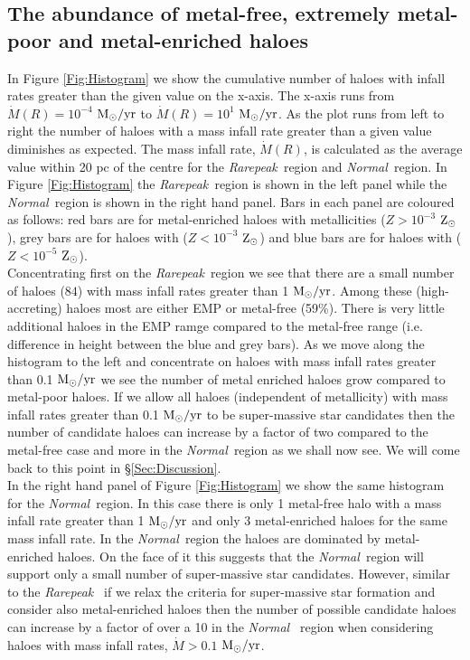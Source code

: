 \documentclass[graphics, twocolumn, usenatbib]{mn2e}
\newcommand{\msolaryr} {$\rm{M_{\odot}/yr}~$}
\newcommand{\msolaryrc} {$\rm{M_{\odot}/yr}$}
\newcommand{\zsolarc} {$\rm{Z_{\odot}}$}
\newcommand{\rarepeak} {\textit{Rarepeak~}}
\newcommand{\normal} {\textit{Normal~}}
\begin{document}
\subsection{The abundance of metal-free, extremely metal-poor and metal-enriched haloes}
In Figure \ref{Fig:Histogram} we show the cumulative number of haloes with infall rates greater than
the given value on the x-axis. The x-axis runs from $\dot{M}(R) = 10^{-4}$ \msolaryr to 
$\dot{M}(R) = 10^{1}$ \msolaryrc. As the plot runs from left to right the number of haloes with a
mass infall rate greater than a given value diminishes as expected. The mass infall rate,
$\dot{M}(R)$, is calculated as the average value within 20 pc of the centre for the \rarepeak region
and \normal region. In Figure  \ref{Fig:Histogram} the
\rarepeak region is shown in the left panel while the \normal region is shown in the right hand
panel. Bars in each panel are coloured as follows: red bars are for metal-enriched haloes with
metallicities ($Z > 10^{-3}$ \zsolarc), grey bars are for haloes with ($Z < 10^{-3}$ \zsolarc) and
blue bars are for haloes with ($Z < 10^{-5}$ \zsolarc).\\
\indent Concentrating first on the \rarepeak region we see that there are a small number of
haloes ($84$) with mass infall rates greater than 1 \msolaryrc. Among these (high-accreting)
haloes most are either EMP or metal-free (59\%). There is very little additional haloes in the
EMP ramge compared to the metal-free range (i.e. difference in height between the
blue and grey bars). As we move along the histogram to the
left and concentrate on haloes with mass infall rates greater than 0.1 \msolaryr we see the
number of metal enriched haloes grow compared to
metal-poor haloes. If we allow all haloes (independent of metallicity) with mass infall rates greater
than  0.1 \msolaryr to be super-massive star candidates then the number of candidate haloes can
increase by a factor of two compared to the metal-free case and more in the \normal region as we
shall now see. We will come back to this point in \S \ref{Sec:Discussion}. \\
\indent In the right hand panel of Figure \ref{Fig:Histogram}
we show the same histogram for the \normal region. In this case there is only 1 metal-free halo
with a mass infall rate greater than 1 \msolaryr and only 3 metal-enriched haloes for the
same mass infall rate. In the \normal region the haloes are dominated by metal-enriched haloes.
On the face of it this suggests that the \normal region will
support only a small number of super-massive star candidates. However, similar to the \rarepeak
if we relax the criteria for super-massive star formation and consider also metal-enriched haloes
then the number of possible candidate haloes can increase by a factor of over a 10 in the \normal
region when considering haloes with mass infall rates, $\dot{M} > 0.1 $ \msolaryrc. 
\end{document}
